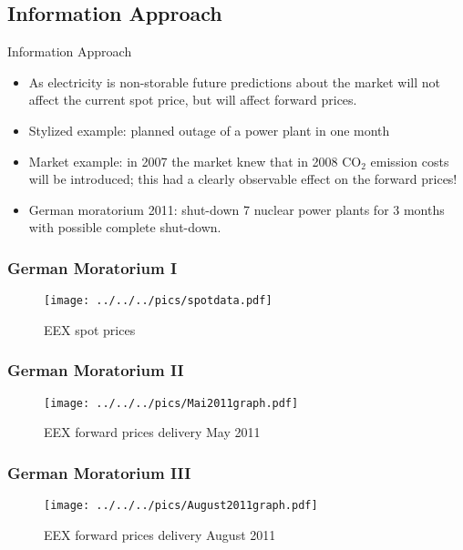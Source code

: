 \subsection{Information Approach}



{Information Approach}
\begin{itemize}
\item<1-> As electricity is non-storable future predictions about the market will not affect the current spot price, but will affect forward prices.
\item<2-> Stylized example: planned outage of a power plant in one month
\item<3-> Market example: in 2007 the market knew that in 2008 CO$_2$ emission costs will be introduced; this had a clearly observable effect on the forward prices!
\item<4-> German moratorium 2011: shut-down 7 nuclear power plants for 3 months with possible complete shut-down.
\end{itemize}



\begin{frame}
  \frametitle{German Moratorium I}

\begin{figure}[htbp]

  \texttt{[image: ../../../pics/spotdata.pdf]}
    \caption{EEX spot prices}
\end{figure}

\end{frame}

\begin{frame}
  \frametitle{German Moratorium II}

\begin{figure}[htbp]

  \texttt{[image: ../../../pics/Mai2011graph.pdf]}
    \caption{EEX forward prices delivery May 2011}
\end{figure}

\end{frame}
\begin{frame}
  \frametitle{German Moratorium III}

\begin{figure}[htbp]

  \texttt{[image: ../../../pics/August2011graph.pdf]}
    \caption{EEX forward prices delivery August 2011}
\end{figure}

\end{frame}


